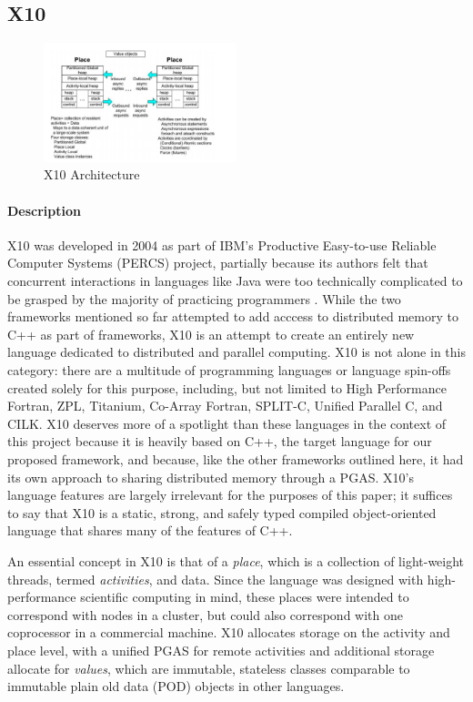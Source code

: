 \normalsize

\subsection{X10}
    \begin{figure}[ht]
		\centering
		\includegraphics[width=0.50\textwidth]{Figures/x10_arch.png}
		\caption{X10 Architecture \cite{X10_2005}}
        \label{fig:x10_arch}
    \end{figure}
	\paragraph{Description} \label{X10_desc}
X10 was developed in 2004 as part of IBM's Productive Easy-to-use Reliable Computer Systems (PERCS) project, partially because its authors felt that concurrent interactions in languages like Java were too technically complicated to be grasped by the majority of practicing programmers \cite{X10}. While the two frameworks mentioned so far attempted to add acccess to distributed memory to C++ as part of frameworks, X10 is an attempt to create an entirely new language dedicated to distributed and parallel computing. X10 is not alone in this category: there are a multitude of programming languages or language spin-offs created solely for this purpose, including, but not limited to High Performance Fortran, ZPL, Titanium, Co-Array Fortran, SPLIT-C, Unified Parallel C, and CILK. X10 deserves more of a spotlight than these languages in the context of this project because it is heavily based on C++, the target language for our proposed framework, and because, like the other frameworks outlined here, it had its own approach to sharing distributed memory through a PGAS. X10's language features are largely irrelevant for the purposes of this paper; it suffices to say that X10 is a static, strong, and safely typed compiled object-oriented language that shares many of the features of C++. 

An essential concept in X10 is that of a \textit{place}, which is a collection of light-weight threads, termed \textit{activities}, and data. Since the language was designed with high-performance scientific computing in mind, these places were intended to correspond with nodes in a cluster, but could also correspond with one coprocessor in a commercial machine. X10 allocates storage on the activity and place level, with a unified PGAS for remote activities and additional storage allocate for \textit{values}, which are immutable, stateless classes comparable to immutable plain old data (POD) objects in other languages. 

